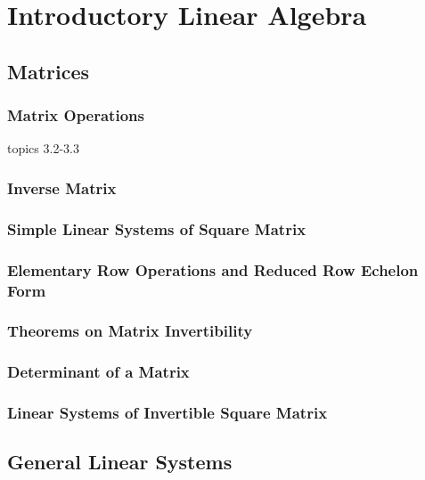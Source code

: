 \documentclass[
  a4paper,
]{report}
\begin{document}
\part{Introductory Linear Algebra}\label{introductory-linear-algebra}

\chapter{Matrices}\label{matrices}

\section{Matrix Operations}\label{matrix-operations}

topics 3.2-3.3

\section{Inverse Matrix}\label{inverse-matrix}

\section{Simple Linear Systems of Square
Matrix}\label{simple-linear-systems-of-square-matrix}

\section{Elementary Row Operations and Reduced Row Echelon
Form}\label{elementary-row-operations-and-reduced-row-echelon-form}

\section{Theorems on Matrix
Invertibility}\label{theorems-on-matrix-invertibility}

\section{Determinant of a Matrix}\label{determinant-of-a-matrix}

\section{Linear Systems of Invertible Square
Matrix}\label{linear-systems-of-invertible-square-matrix}

\chapter{General Linear Systems}\label{general-linear-systems}
\end{document}
